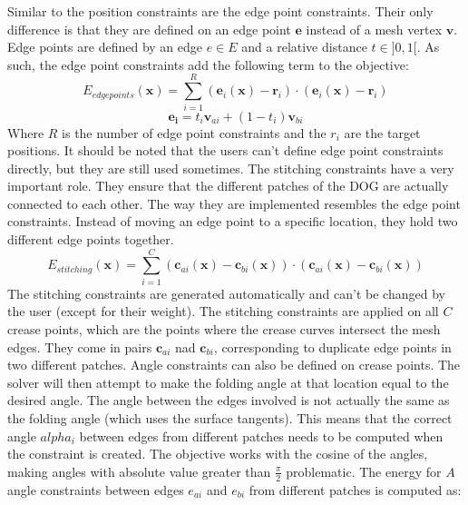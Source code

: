 \documentclass[a4paper,twoside,12pt,nochapterprefix]{scrbook}
\begin{document}
Similar to the position constraints are the edge point constraints. Their only difference is that they are defined on an edge point $\mathbf{e}$ instead of a mesh vertex $\mathbf{v}$. Edge points are defined by an edge $e \in E$ and a relative distance $t \in ]0,1[$. As such, the edge point constraints add the following term to the objective:
\begin{equation}
E_{edgepoints}(\mathbf{x}) = \sum_{i = 1}^R (\mathbf{e}_i(\mathbf{x}) - \mathbf{r}_i) \cdot (\mathbf{e}_i(\mathbf{x}) - \mathbf{r}_i)
\end{equation}
\begin{equation}
\mathbf{e_i} = t_i \mathbf{v}_{ai} + (1-t_i) \mathbf{v}_{bi}
\end{equation}
Where $R$ is the number of edge point constraints and the $r_i$ are the target positions. It should be noted that the users can't define edge point constraints directly, but they are still used sometimes.\newline
The stitching constraints have a very important role. They ensure that the different patches of the DOG are actually connected to each other. The way they are implemented resembles the edge point constraints. Instead of moving an edge point to a specific location, they hold two different edge points together.
\begin{equation}
E_{stitching}(\mathbf{x}) = \sum_{i = 1}^C (\mathbf{c}_{ai}(\mathbf{x}) - \mathbf{c}_{bi}(\mathbf{x})) \cdot (\mathbf{c}_{ai}(\mathbf{x}) - \mathbf{c}_{bi}(\mathbf{x}))
\end{equation}
The stitching constraints are generated automatically and can't be changed by the user (except for their weight). The stitching constraints are applied on all $C$ crease points, which are the points where the crease curves intersect the mesh edges. They come in pairs $\mathbf{c}_{ai}$ nad $\mathbf{c}_{bi}$, corresponding to duplicate edge points in two different patches.\newline
Angle constraints can also be defined on crease points. The solver will then attempt to make the folding angle at that location equal to the desired angle. The angle between the edges involved is not actually the same as the folding angle (which uses the surface tangents). This means that the correct angle $alpha_i$ between edges from different patches needs to be computed when the constraint is created. The objective works with the cosine of the angles, making angles with absolute value greater than $\frac{\pi}{2}$ problematic. The energy for $A$ angle constraints between edges $e_{ai}$ and $e_{bi}$ from different patches is computed as:
\end{document}
